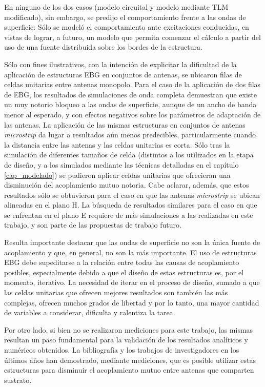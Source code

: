 En ninguno de los dos casos (modelo circuital y modelo mediante TLM modificado), sin embargo, se predijo el comportamiento frente a las ondas de superficie: Sólo se modeló el comportamiento ante excitaciones conducidas, en vistas de lograr, a futuro, un modelo que permita comenzar el cálculo a partir del uso de una fuente distribuida sobre los bordes de la estructura.

Sólo con fines ilustrativos, con la intención de explicitar la dificultad de la aplicación de estructuras EBG en conjuntos de antenas, se ubicaron filas de celdas unitarias entre antenas monopolo. Para el caso de la aplicación de dos filas de EBG, los resultados de simulaciones de onda completa demuestran que existe un muy notorio bloqueo a las ondas de superficie, aunque de un ancho de banda menor al esperado, y con efectos negativos sobre los parámetros de adaptación de las antenas. La aplicación de las mismas estructuras en conjuntos de antenas \textit{microstrip} da lugar a resultados aún menos predecibles, particularmente cuando la distancia entre las antenas y las celdas unitarias es corta. Sólo tras la simulación de diferentes tamaños de celda (distintos a los utilizados en la etapa de diseño, y a los simulados  mediante las técnicas detalladas en el capítulo \ref{cap_modelado}) se pudieron aplicar celdas unitarias que ofrecieran una disminución del acoplamiento mutuo notoria. Cabe aclarar, además, que estos resultados sólo se obtuvieron para el caso en que las antenas \textit{microstrip} se ubican alineadas en el plano H. La búsqueda de resultados similares para el caso en que se enfrentan en el plano E requiere de más simulaciones a las realizadas en este trabajo, y son parte de las propuestas de trabajo futuro.

Resulta importante destacar que las ondas de superficie no son la única fuente de acoplamiento y que, en general, no son la más importante. El uso de estructuras EBG debe supeditarse a la relación entre todas las causas de acoplamiento posibles, especialmente debido a que el diseño de estas estructuras es, por el momento, iterativo. La necesidad de iterar en el proceso de diseño, sumado a que las celdas unitarias que ofrecen mejores resultados son también las más complejas, ofrecen muchos grados de libertad y por lo tanto, una mayor cantidad de variables a considerar, dificulta y ralentiza la tarea.

Por otro lado, si bien no se realizaron mediciones para este trabajo, las mismas resultan un paso fundamental para la validación de los resultados analíticos y numéricos obtenidos. La bibliografía y los trabajos de investigadores en los últimos años han demostrado, mediante mediciones, que es posible utilizar estas estructuras para disminuir el acoplamiento mutuo entre antenas que comparten sustrato.

